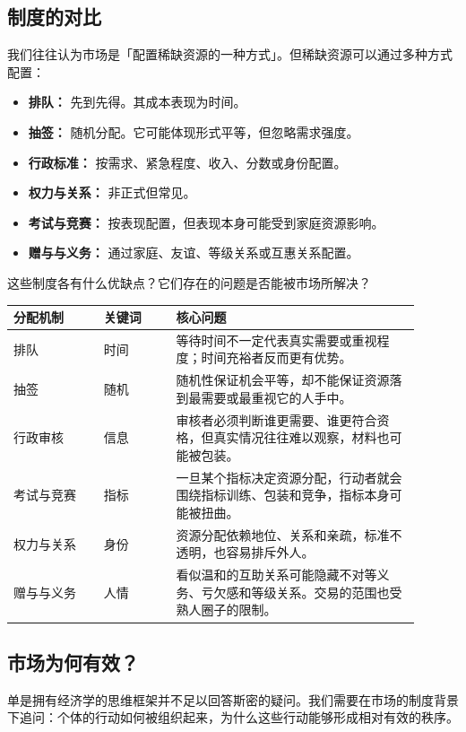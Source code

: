 \documentclass[UTF8,10pt,a4paper,scheme=chinese,fontset=none]{ctexart}
\begin{document}
\subsection{制度的对比}

我们往往认为市场是「配置稀缺资源的一种方式」。但稀缺资源可以通过多种方式配置：
\begin{itemize}
  \item \textbf{排队：} 先到先得。其成本表现为时间。
  \item \textbf{抽签：} 随机分配。它可能体现形式平等，但忽略需求强度。
  \item \textbf{行政标准：} 按需求、紧急程度、收入、分数或身份配置。
  \item \textbf{权力与关系：} 非正式但常见。
  \item \textbf{考试与竞赛：} 按表现配置，但表现本身可能受到家庭资源影响。
  \item \textbf{赠与与义务：} 通过家庭、友谊、等级关系或互惠关系配置。
\end{itemize}

这些制度各有什么优缺点？它们存在的问题是否能被市场所解决？

\begin{center}
\small
\begin{tabular}{p{0.20\linewidth}p{0.16\linewidth}p{0.54\linewidth}}
\hline
\textbf{分配机制} & \textbf{关键词} & \textbf{核心问题} \tabularnewline
\hline
排队 & 时间 & 等待时间不一定代表真实需要或重视程度；时间充裕者反而更有优势。 \tabularnewline
抽签 & 随机 & 随机性保证机会平等，却不能保证资源落到最需要或最重视它的人手中。 \tabularnewline
行政审核 & 信息 & 审核者必须判断谁更需要、谁更符合资格，但真实情况往往难以观察，材料也可能被包装。 \tabularnewline
考试与竞赛 & 指标 & 一旦某个指标决定资源分配，行动者就会围绕指标训练、包装和竞争，指标本身可能被扭曲。 \tabularnewline
权力与关系 & 身份 & 资源分配依赖地位、关系和亲疏，标准不透明，也容易排斥外人。 \tabularnewline
赠与与义务 & 人情 & 看似温和的互助关系可能隐藏不对等义务、亏欠感和等级关系。交易的范围也受熟人圈子的限制。 \tabularnewline
\hline
\end{tabular}
\end{center}


\subsection{市场为何有效？}
单是拥有经济学的思维框架并不足以回答斯密的疑问。我们需要在市场的制度背景下追问：个体的行动如何被组织起来，为什么这些行动能够形成相对有效的秩序。
\end{document}
